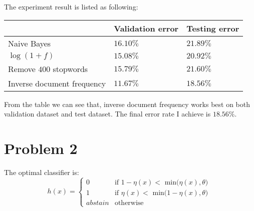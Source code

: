 \documentclass[a4paper,11pt]{article}
\theoremstyle{mytheor}
\begin{document}
The experiment result is listed as following:

\begin{center}
\begin{tabular}{|l|l|l|}
	\hline 
	& Validation error &  Testing error   \\ \hline
	Naive Bayes	& $16.10\%$ & $21.89\%$  \\ \hline 
	$\log(1+f)$ & $15.08\%$ & $20.92\%$  \\ \hline
	Remove $400$ stopwords & $15.79\%$ & $21.60\%$ \\ \hline 
	Inverse document frequency & $11.67\%$ & $18.56\%$ \\ \hline
\end{tabular}
\end{center}

From the table we can see that, inverse document frequency works best on both validation dataset and test dataset. The final error rate I achieve is $18.56\%$.


\section*{Problem 2}
The optimal classifier is:
\begin{equation}
h(x) = \left\{ \begin{array}{ll}
0 & \mbox{if $1-\eta(x) < $ min($\eta(x), \theta$)  }\\
1 & \mbox{if $\eta(x) < $ min($1-\eta(x), \theta$)  }\\
abstain & \mbox{otherwise}
\end{array} 
\right.
\end{equation}
\end{document}
